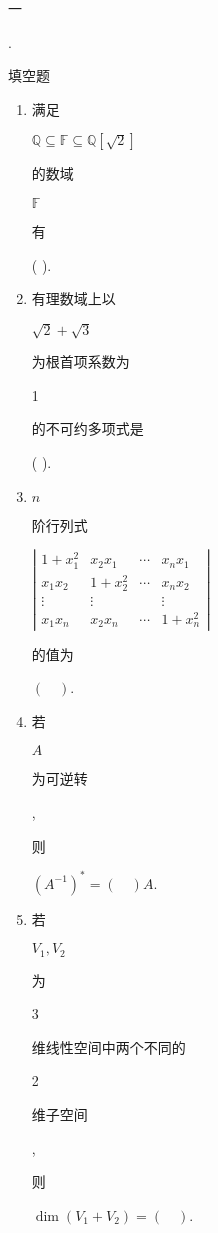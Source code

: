 \documentclass[10pt]{article}
\begin{document}
\begin{CJK}{UTF8}{mj}一\end{CJK}. \begin{CJK}{UTF8}{mj}填空题\end{CJK}

\begin{enumerate}
  \item \begin{CJK}{UTF8}{mj}满足\end{CJK} $\mathbb{Q} \subseteq \mathbb{F} \subseteq \mathbb{Q}[\sqrt{2}]$ \begin{CJK}{UTF8}{mj}的数域\end{CJK} $\mathbb{F}$ \begin{CJK}{UTF8}{mj}有\end{CJK} ( ).

  \item \begin{CJK}{UTF8}{mj}有理数域上以\end{CJK} $\sqrt{2}+\sqrt{3}$ \begin{CJK}{UTF8}{mj}为根首项系数为\end{CJK} 1 \begin{CJK}{UTF8}{mj}的不可约多项式是\end{CJK} ( ).

  \item $n$ \begin{CJK}{UTF8}{mj}阶行列式\end{CJK} $\left|\begin{array}{cccc}1+x_{1}^{2} & x_{2} x_{1} & \cdots & x_{n} x_{1} \\ x_{1} x_{2} & 1+x_{2}^{2} & \cdots & x_{n} x_{2} \\ \vdots & \vdots & & \vdots \\ x_{1} x_{n} & x_{2} x_{n} & \cdots & 1+x_{n}^{2}\end{array}\right|$ \begin{CJK}{UTF8}{mj}的值为\end{CJK} $(\quad)$.

  \item \begin{CJK}{UTF8}{mj}若\end{CJK} $A$ \begin{CJK}{UTF8}{mj}为可逆转\end{CJK}, \begin{CJK}{UTF8}{mj}则\end{CJK} $\left(A^{-1}\right)^{*}=(\quad) A$.

  \item \begin{CJK}{UTF8}{mj}若\end{CJK} $V_{1}, V_{2}$ \begin{CJK}{UTF8}{mj}为\end{CJK} 3 \begin{CJK}{UTF8}{mj}维线性空间中两个不同的\end{CJK} 2 \begin{CJK}{UTF8}{mj}维子空间\end{CJK}, \begin{CJK}{UTF8}{mj}则\end{CJK} $\operatorname{dim}\left(V_{1}+V_{2}\right)=(\quad)$.


\end{enumerate}
\end{document}
